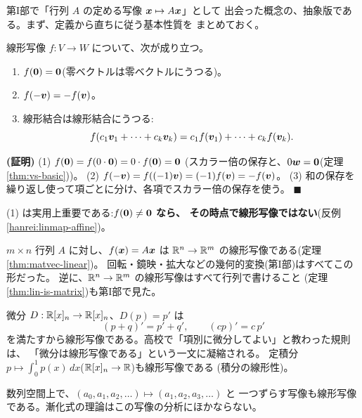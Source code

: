 第I部で「行列 $A$ の定める写像 $\bm{x} \mapsto A\bm{x}$」として
出会った概念の、抽象版である。まず、定義から直ちに従う基本性質を
まとめておく。

\begin{teiri}[線形写像の基本性質]\label{thm:linmap-basic}
線形写像 $f : V \to W$ について、次が成り立つ。
\begin{enumerate}
\item $f(\bm{0}) = \bm{0}$(零ベクトルは零ベクトルにうつる)。
\item $f(-\bm{v}) = -f(\bm{v})$。
\item 線形結合は線形結合にうつる:
\[
f(c_1\bm{v}_1 + \cdots + c_k\bm{v}_k)
= c_1 f(\bm{v}_1) + \cdots + c_k f(\bm{v}_k).
\]
\end{enumerate}
\end{teiri}

\noindent\textbf{(証明)}\quad
(1) $f(\bm{0}) = f(0 \cdot \bm{0}) = 0 \cdot f(\bm{0}) = \bm{0}$
(スカラー倍の保存と、$0\bm{w} = \bm{0}$(定理 \ref{thm:vs-basic}))。
(2) $f(-\bm{v}) = f((-1)\bm{v}) = (-1)f(\bm{v}) = -f(\bm{v})$。
(3) 和の保存を繰り返し使って項ごとに分け、各項でスカラー倍の保存を使う。
$\blacksquare$

(1) は実用上重要である:\textbf{$f(\bm{0}) \neq \bm{0}$ なら、
その時点で線形写像ではない}(反例 \ref{hanrei:linmap-affine})。

\begin{rei}[行列の定める写像]
$m \times n$ 行列 $A$ に対し、$f(\bm{x}) = A\bm{x}$ は
$\mathbb{R}^n \to \mathbb{R}^m$ の線形写像である(定理 \ref{thm:matvec-linear})。
回転・鏡映・拡大などの幾何的変換(第I部)はすべてこの形だった。
逆に、$\mathbb{R}^n \to \mathbb{R}^m$ の線形写像はすべて行列で書けること
(定理 \ref{thm:lin-is-matrix})も第I部で見た。
\end{rei}

\begin{rei}[微分は線形写像である]
微分 $D : \mathbb{R}[x]_n \to \mathbb{R}[x]_n$、$D(p) = p'$ は
\[
(p + q)' = p' + q', \qquad (cp)' = c\,p'
\]
を満たすから線形写像である。高校で「項別に微分してよい」と教わった規則は、
「微分は線形写像である」という一文に凝縮される。
定積分 $p \mapsto \int_0^1 p(x)\,dx$($\mathbb{R}[x]_n \to \mathbb{R}$)も線形写像である
(積分の線形性)。
\end{rei}

\begin{rei}[数列のシフト]
数列空間上で、$(a_0, a_1, a_2, \dots) \mapsto (a_1, a_2, a_3, \dots)$ と
一つずらす写像も線形写像である。漸化式の理論はこの写像の分析にほかならない。
\end{rei}

